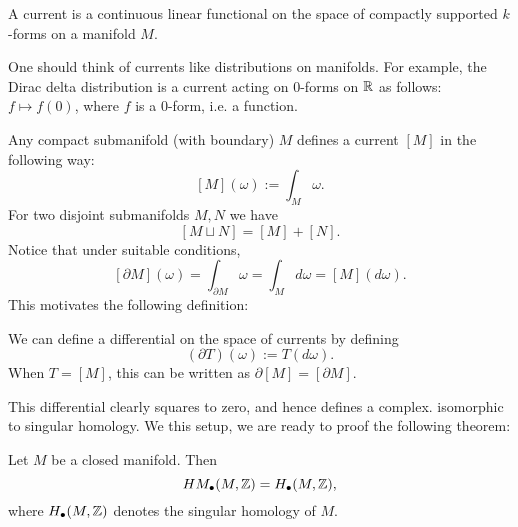 \begin{definition}[Current]
    A current is a continuous linear functional on the space of compactly supported $k$-forms on a manifold $M$.
\end{definition}
\begin{remark}
    One should think of currents like distributions on manifolds. For example, the Dirac delta distribution is a current acting on $0$-forms on $\R$ as follows: $f \mapsto  f(0)$, where $f$ is a $0$-form, i.e. a function.
\end{remark}
\begin{eg}
    Any compact submanifold (with boundary) $M$ defines a current $[M]$ in the following way:
    \[
        [M](\omega) := \int_M \omega
    .\] 
    For two disjoint submanifolds $M, N$ we have
    \[
        [M \sqcup N] = [M] + [N]
    .\] 
    Notice that under suitable conditions,
    \[
        [\partial M](\omega) = \int_{\partial M} \omega = \int_M d \omega = [M](d \omega).
    \] 
    This motivates the following definition:
\end{eg}
\begin{definition}
    We can define a differential on the space of currents by defining
    \[
        (\partial T) (\omega) := T(d \omega)
    .\] 
    When $T = [M]$, this can be written as $\partial [M] = [\partial M]$. 
\end{definition}
This differential clearly squares to zero, and hence defines a complex.
 isomorphic to singular homology.
We this setup, we are ready to proof the following theorem:

\begin{theorem}
    Let $M$ be a closed manifold. Then
     \[
         \HMf[\bul]{M, \Z} = H_{\bul}(M, \Z)
    ,\] 
    where $H_{\bul}(M, \Z)$ denotes the singular homology of $M$.
\end{theorem}

